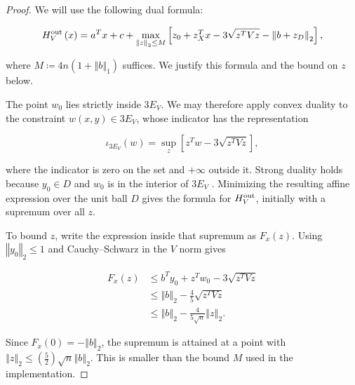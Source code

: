 {{\begin{proof}
We will use the following dual formula:


\begin{equation*}
H_{V}^{\text{\normalfont out}} \left( x \right) = a^{T} x + c + \operatorname*{max}_{{\left\Vert z \right\Vert}_{2} \le M} \left[ z_{0} + z_{X}^{T} x - 3 \sqrt{z^{T} V z} - {\left\Vert b + z_{D} \right\Vert}_{2} \right] ,
\end{equation*}


where $M \coloneqq 4 n \left( 1 + {\left\Vert b \right\Vert}_{1} \right)$ suffices. We justify this formula and the bound on $z$ below.

The point $w_{0}$ lies strictly inside $3 E_{V}$. We may therefore apply convex
duality to the constraint $w \left( x , y \right) \in 3 E_{V}$, whose indicator has the
representation


\begin{equation*}
\iota_{3 E_{V}} \left( w \right) = \operatorname*{sup}_{z} \left[ z^{T} w - 3 \sqrt{z^{T} V z} \right] ,
\end{equation*}


where the indicator is zero on the set and $+ \infty$ outside it.
Strong duality holds because $y_{0} \in D$ and $w_{0}$ is in the interior
of $3 E_{V}$ \citep{boyd2004convex}. Minimizing the resulting affine expression
over the unit ball $D$ gives the formula for $H_{V}^{\text{\normalfont out}}$, initially
with a supremum over all $z$.

To bound $z$, write the expression inside that supremum as $F_{x} \left( z \right)$.
Using ${\left\Vert y_{0} \right\Vert}_{2} \le 1$ and Cauchy--Schwarz in the $V$ norm gives


\begin{equation*}
\begin{aligned}
F_{x} \left( z \right) & \le b^{T} y_{0} + z^{T} w_{0} - 3 \sqrt{z^{T} V z} \\
 & \le {\left\Vert b \right\Vert}_{2} - \frac{4}{5} \sqrt{z^{T} V z} \\
 & \le {\left\Vert b \right\Vert}_{2} - \frac{4}{5 \sqrt{n}} {\left\Vert z \right\Vert}_{2} .
\end{aligned}
\end{equation*}


Since $F_{x} \left( 0 \right) = - {\left\Vert b \right\Vert}_{2}$, the supremum is attained at a point with
${\left\Vert z \right\Vert}_{2} \le \left( \frac{5}{2} \right) \sqrt{n} {\left\Vert b \right\Vert}_{2}$. This is smaller than the bound
$M$ used in the implementation.


\end{proof}}}
